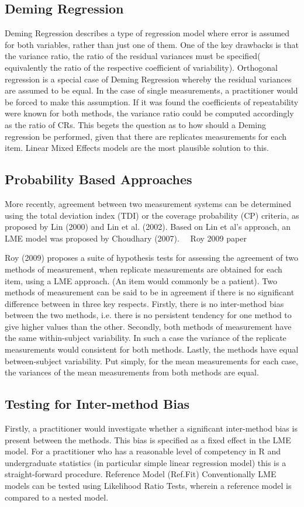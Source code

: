 \subsection*{Deming Regression}
Deming Regression describes a type of regression model where error is assumed for both variables, rather than just one of them. One of the key drawbacks is that the variance ratio, the ratio of the residual variances must be specified( equivalently the ratio of the respective coefficient of variability).
Orthogonal regression is a special case of Deming Regression whereby the residual variances are assumed to be equal.  In the case of single measurements, a practitioner would be forced to make this assumption. If it was found the coefficients of repeatability were known for both methods, the variance ratio could be computed accordingly as the ratio of CRs.  
This begets the question as to how should a Deming regression be performed, given that there are replicates measurements for each item. Linear Mixed Effects models are the most plausible solution to this.
\subsection*{Probability Based Approaches}
More recently, agreement between two measurement systems can be determined using the total deviation index (TDI) or the coverage probability (CP) criteria, as proposed by Lin (2000) and Lin et al. (2002). Based on Lin et al's approach, an LME model was proposed by Choudhary (2007). 
Roy 2009 paper

Roy (2009) proposes a suite of hypothesis tests for assessing the agreement of two methods of measurement, when replicate measurements are obtained for each item, using a LME approach. (An item would commonly be a patient).  
Two methods of measurement can be said to be in agreement if there is no significant difference between in three key respects. Firstly, there is no inter-method bias between the two methods, i.e. there is no persistent tendency for one method to give higher values than the other.
Secondly, both methods of measurement have the same  within-subject variability. In such a case the variance of the replicate measurements would consistent for both methods.
Lastly, the methods have equal between-subject variability.  Put simply, for the mean measurements for each case, the variances of the mean measurements from both methods are equal.
\subsection*{Testing for Inter-method Bias}
Firstly, a practitioner would investigate whether a significant inter-method bias is present between the methods. This bias is specified as a fixed effect in the LME model.  For a practitioner who has a reasonable level of competency in R and undergraduate statistics (in particular simple linear regression model) this is a straight-forward procedure.
Reference Model (Ref.Fit)
Conventionally LME models can be tested using Likelihood Ratio Tests, wherein a reference model is compared to a nested model.

